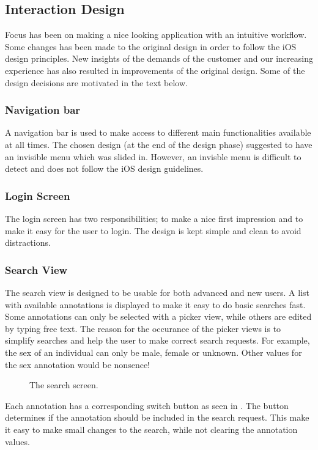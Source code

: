 \subsection{Interaction Design}
Focus has been on making a nice looking application with an intuitive workflow. Some changes has been made to the original design in order to follow the iOS design principles. New insights of the demands of the customer and our increasing experience has also resulted in improvements of the original design. Some of the design decisions are motivated in the text below.


\subsubsection{Navigation bar}
A navigation bar is used to make access to different main functionalities available at all times. The chosen design (at the end of the design phase) suggested to have an invisible menu which was slided in. However, an invisble menu is difficult to detect and does not follow the iOS design guidelines.


\subsubsection{Login Screen}
The login screen has two responsibilities; to make a nice first impression and to make it easy for the user to login. The design is kept simple and clean to avoid distractions.

\subsubsection{Search View}
The search view is designed to be usable for both advanced and new users. A list with available annotations is displayed to make it easy to do basic searches fast. Some annotations can only be selected with a picker view, while others are edited by typing free text. The reason for the occurance of the picker views is to simplify searches and help the user to make correct search requests. For example, the sex of an individual can only be male, female or unknown. Other values for the sex annotation would be nonsence!

\begin{figure}[ht]
\caption{The search screen.}
\label{fig:ios_search2}
\end{figure}
\FloatBarrier

Each annotation has a corresponding switch button as seen in . The button determines if the annotation should be included in the search request. This make it easy to make small changes to the search, while not clearing the annotation values.

